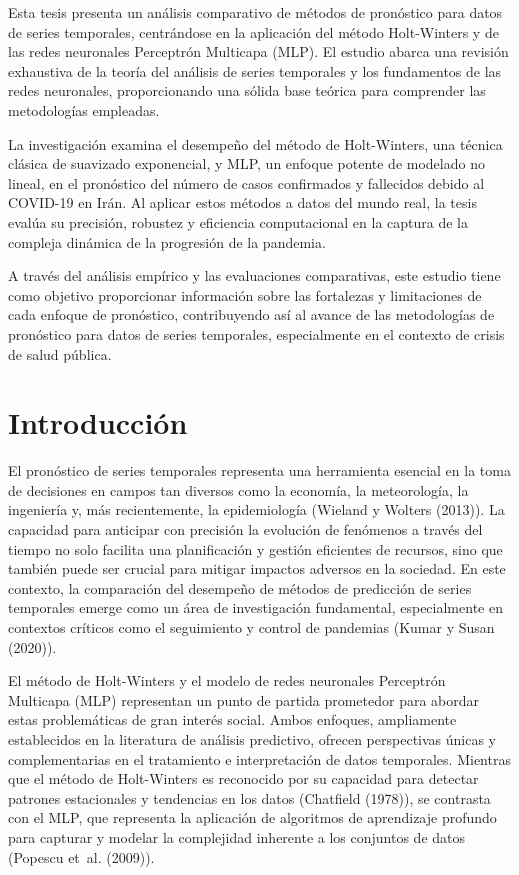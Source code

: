 \documentclass[
  us-letterpaper,
]{scrreprt}
\theoremstyle{plain}
\theoremstyle{definition}
\theoremstyle{definition}
\theoremstyle{plain}
\theoremstyle{remark}
\begin{document}

Esta tesis presenta un análisis comparativo de métodos de pronóstico
para datos de series temporales, centrándose en la aplicación del método
Holt-Winters y de las redes neuronales Perceptrón Multicapa (MLP). El
estudio abarca una revisión exhaustiva de la teoría del análisis de
series temporales y los fundamentos de las redes neuronales,
proporcionando una sólida base teórica para comprender las metodologías
empleadas.

La investigación examina el desempeño del método de Holt-Winters, una
técnica clásica de suavizado exponencial, y MLP, un enfoque potente de
modelado no lineal, en el pronóstico del número de casos confirmados y
fallecidos debido al COVID-19 en Irán. Al aplicar estos métodos a datos
del mundo real, la tesis evalúa su precisión, robustez y eficiencia
computacional en la captura de la compleja dinámica de la progresión de
la pandemia.

A través del análisis empírico y las evaluaciones comparativas, este
estudio tiene como objetivo proporcionar información sobre las
fortalezas y limitaciones de cada enfoque de pronóstico, contribuyendo
así al avance de las metodologías de pronóstico para datos de series
temporales, especialmente en el contexto de crisis de salud pública.


\chapter*{Introducción}\label{introducciuxf3n}


El pronóstico de series temporales representa una herramienta esencial
en la toma de decisiones en campos tan diversos como la economía, la
meteorología, la ingeniería y, más recientemente, la epidemiología
(Wieland y Wolters (2013)). La capacidad para anticipar con precisión la
evolución de fenómenos a través del tiempo no solo facilita una
planificación y gestión eficientes de recursos, sino que también puede
ser crucial para mitigar impactos adversos en la sociedad. En este
contexto, la comparación del desempeño de métodos de predicción de
series temporales emerge como un área de investigación fundamental,
especialmente en contextos críticos como el seguimiento y control de
pandemias (Kumar y Susan (2020)).

El método de Holt-Winters y el modelo de redes neuronales Perceptrón
Multicapa (MLP) representan un punto de partida prometedor para abordar
estas problemáticas de gran interés social. Ambos enfoques, ampliamente
establecidos en la literatura de análisis predictivo, ofrecen
perspectivas únicas y complementarias en el tratamiento e interpretación
de datos temporales. Mientras que el método de Holt-Winters es
reconocido por su capacidad para detectar patrones estacionales y
tendencias en los datos (Chatfield (1978)), se contrasta con el MLP, que
representa la aplicación de algoritmos de aprendizaje profundo para
capturar y modelar la complejidad inherente a los conjuntos de datos
(Popescu et~al. (2009)).
\end{document}
